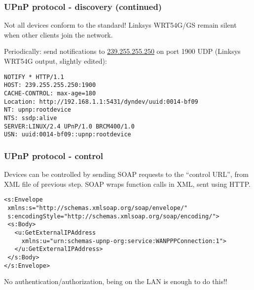 \documentclass[10pt]{beamer}
\begin{document}
\begin{frame}[fragile]

\frametitle{UPnP protocol - discovery (continued)}

Not all devices conform to the standard! Linksys WRT54G/GS remain silent when
other clients join the network.

Periodically: send notifications to \url{239.255.255.250} on port 1900 UDP
(Linksys WRT54G output, slightly edited):

\begin{verbatim}
NOTIFY * HTTP/1.1
HOST: 239.255.255.250:1900
CACHE-CONTROL: max-age=180
Location: http://192.168.1.1:5431/dyndev/uuid:0014-bf09
NT: upnp:rootdevice
NTS: ssdp:alive
SERVER:LINUX/2.4 UPnP/1.0 BRCM400/1.0
USN: uuid:0014-bf09::upnp:rootdevice
\end{verbatim}

\end{frame}


\begin{frame}[fragile]

\frametitle{UPnP protocol - control}

Devices can be controlled by sending SOAP requests to the ``control
URL'', from XML file of previous step. SOAP wraps function calls in XML,
sent using HTTP.

\begin{verbatim}
<s:Envelope
 xmlns:s="http://schemas.xmlsoap.org/soap/envelope/"
 s:encodingStyle="http://schemas.xmlsoap.org/soap/encoding/">
 <s:Body>
   <u:GetExternalIPAddress
     xmlns:u="urn:schemas-upnp-org:service:WANPPPConnection:1">
   </u:GetExternalIPAddress>
 </s:Body>
</s:Envelope>
\end{verbatim}

No authentication/authorization, being on the LAN is enough to do this!!

\end{frame}
\end{document}
